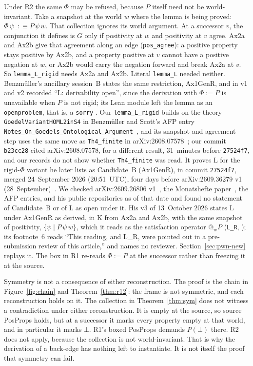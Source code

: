 \documentclass[11pt,a4paper]{article}
\newcommand{\lean}[1]{\texttt{#1}}
\theoremstyle{definition}
\theoremstyle{remark}
\begin{document}
Under R2 the same \(\Phi\) may be refused, because \(P\) itself need not be
world-invariant.
Take a snapshot at the world \(w\) where the lemma is being proved:
\(\Phi\,\psi\,\_ :\equiv P\,\psi\,w\).
That collection ignores its world argument.
At a successor \(v\), the conjunction it defines is \(G\) only if positivity at
\(w\) and positivity at \(v\) agree.
Ax2a and Ax2b give that agreement along an edge
(\lean{pos\_agree}): a positive property stays positive by Ax2b, and a
property positive at \(v\) cannot have a positive negation at \(w\), or Ax2b
would carry the negation forward and break Ax2a at \(v\).
So \lean{lemma\_L\_rigid} needs Ax2a and Ax2b.
Literal \lean{lemma\_L} needed neither.
Benzm\"uller's ancillary session~B states the same restriction, Ax1GenR, and
in v1 and v2 recorded ``L: derivability open'', since the derivation with
\(\Phi := P\) is unavailable when \(P\) is not rigid; its Lean module left the
lemma as an \lean{openproblem}, that is, a \lean{sorry}
\cite{benzmuellerPWN2026}.
Our \lean{lemma\_L\_rigid} builds on the theory \lean{GoedelVariantHOML2inS4} in Benzm\"uller and Scott's AFP entry \lean{Notes\_On\_Goedels\_Ontological\_Argument}~\cite{afpNotes2025}, and its snapshot-and-agreement step uses the same move as \lean{Th4\_finite} in arXiv:2608.07578~\cite{benzmueller2026}; our commit \lean{b23cc28} cited arXiv:2608.07578, for a different result, 31~minutes before \lean{27524f7}, and our records do not show whether \lean{Th4\_finite} was read.
It proves L for the rigid-\(\Phi\) variant he later lists as Candidate~B (Ax1GenR), in commit \lean{27524f7}, merged 24~September 2026 (20:51~UTC), four days before arXiv:2609.36279 v1 (28~September)~\cite{benzmuellerPWN2026}.
We checked arXiv:2609.26806 v1~\cite{benzmuellerLean2026}, the Monatshefte paper~\cite{benzmuellerScott2025}, the AFP entries, and his public repositories as of that date and found no statement of Candidate~B or of L as open under it.
His v3 of 13~October 2026 states L under Ax1GenR as derived, in K from Ax2a and Ax2b, with the same snapshot of positivity, \(\{\psi \mid P\,\psi\,w\}\), which it reads as the satisfaction operator \(@_w P\) (\lean{L\_R}, \cite[v3, Sect.~6.4.3]{benzmuellerPWN2026}); its footnote~6 reads ``This reading, and L\_R, were pointed out in a pre-submission review of this article,'' and names no reviewer.
Section~\ref{sec:pwn-new} replays it.
The box in R1 re-reads \(\Phi := P\) at the successor rather than freezing it
at the source.

Symmetry is not a consequence of either reconstruction.
The proof is the chain in Figure~\ref{fig:chain} and
Theorem~\ref{thm:r12}: the frame is not symmetric, and each reconstruction
holds on it.
The collection in Theorem~\ref{thm:sym} does not witness a contradiction under
either reconstruction.
It is empty at the source, so source PosProps holds, but at a successor it
marks every property empty at that world, and in particular it marks \(\bot\).
R1's boxed PosProps demands \(P(\bot)\) there.
R2 does not apply, because the collection is not world-invariant.
That is why the derivation of a back-edge has nothing left to instantiate.
It is not itself the proof that symmetry can fail.
\end{document}
